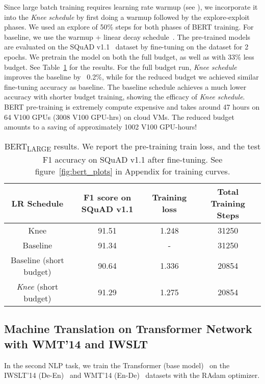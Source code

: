 \documentclass{article} \usepackage{iclr2021_conference,times}
\newcommand{\lrschedule}{\textit{Knee schedule}}
\newcommand{\lrscheduleshort}{\textit{Knee}}
\begin{document}
Since large batch training requires learning rate warmup (see \citet{goyal-imagenet-in-an-hour-2017}), we incorporate it into the \lrschedule{} by first doing a warmup followed by the explore-exploit phases. We used an explore of 50\% steps for both phases of BERT training. For baseline, we use the warmup + linear decay schedule~\citep{bert76lamb,devlin2018bert}. The pre-trained models are evaluated on the SQuAD v1.1~\citep{rajpurkar2016squad} dataset by fine-tuning on the dataset for 2 epochs. We pretrain the model on both the full budget, as well as with 33\% less budget. See Table~\ref{tab:bert_pretraining} for the results. For the full budget run, \lrschedule{} improves the baseline by ~0.2\%, while for the reduced budget we achieved similar fine-tuning accuracy as baseline. The baseline schedule achieves a much lower accuracy with shorter budget training, showing the efficacy of \lrschedule{}. BERT pre-training is extremely compute expensive and takes around 47 hours on 64 V100 GPUs (3008 V100 GPU-hrs) on cloud VMs. The reduced budget amounts to a saving of approximately 1002 V100 GPU-hours!

\vspace{-4pt}
\begin{table}[h]
\small
\centering
\caption{BERT\textsubscript{LARGE} results. We report the pre-training train loss, and the test F1 accuracy on SQuAD v1.1 after fine-tuning. See figure~\ref{fig:bert_plots} in Appendix for training curves.}
\label{tab:bert_pretraining}
\begin{tabular}{cccc}
\toprule
LR Schedule  & F1 score on SQuAD v1.1 & Training loss & Total Training Steps \\ 
\midrule
Knee & 91.51  & 1.248 & 31250\\
Baseline \citep{bert76lamb} &  91.34 & - & 31250 \\
Baseline (short budget)   & 90.64  & 1.336 & 20854\\
\lrscheduleshort{} (short budget)  & 91.29 & 1.275 & 20854\\
\bottomrule
\end{tabular}
\end{table}


\subsection{Machine Translation on Transformer Network with WMT'14 and IWSLT}

In the second NLP task, we train the Transformer (base model)~\citep{vaswani2017attention} on the IWSLT'14 (De-En)~\citep{iwslt_dataset_cettolo2014} and  WMT'14 (En-De)~\citep{wmt14translation}   datasets with the RAdam \citep{liu2019variance_radam} optimizer.
\end{document}
